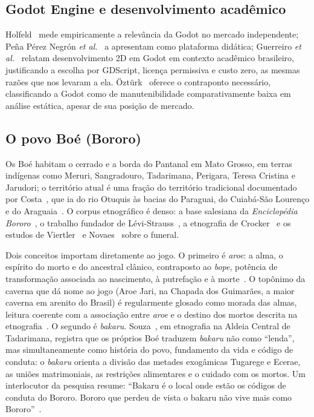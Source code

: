 \documentclass[conference]{IEEEtran}
\begin{document}
\subsection{Godot Engine e desenvolvimento acadêmico}

Holfeld~\cite{holfeld2024} mede empiricamente a relevância da Godot no mercado
independente; Peña Pérez Negrón \textit{et al.}~\cite{penaperez2023} a apresentam como
plataforma didática; Guerreiro \textit{et al.}~\cite{guerreiro2021} relatam
desenvolvimento 2D em Godot em contexto acadêmico brasileiro, justificando a escolha por
GDScript, licença permissiva e custo zero, as mesmas razões que nos levaram a ela.
Öztürk~\cite{ozturk2025} oferece o contraponto necessário, classificando a Godot como de
manutenibilidade comparativamente baixa em análise estática, apesar de sua posição de
mercado.

\subsection{O povo Boé (Bororo)}

Os Boé habitam o cerrado e a borda do Pantanal em Mato Grosso, em terras indígenas como
Meruri, Sangradouro, Tadarimana, Perigara, Teresa Cristina e Jarudori; o território
atual é uma fração do território tradicional documentado por
Costa~\cite{costaikuiapa2019}, que ia do rio Otuquis às bacias do Paraguai, do
Cuiabá-São Lourenço e do Araguaia~\cite{serpa2025}. O corpus etnográfico é denso: a base
salesiana da
\textit{Enciclopédia Bororo}~\cite{albisetti1962,albisetti1969}, o trabalho fundador de
Lévi-Strauss~\cite{levistrauss1936}, a etnografia de Crocker~\cite{crocker1985} e os
estudos de Viertler~\cite{viertler1991} e Novaes~\cite{novaes2006} sobre o funeral.

Dois conceitos importam diretamente ao jogo. O primeiro é \textit{aroe}: a alma, o
espírito do morto e do ancestral clânico, contraposto ao \textit{bope}, potência de
transformação associada ao nascimento, à putrefação e à morte~\cite{serpa2025}. O
topônimo da caverna que dá nome ao jogo (Aroe Jari, na Chapada dos Guimarães, a maior
caverna em arenito do Brasil) é regularmente glosado como morada das almas, leitura
coerente com a associação entre \textit{aroe} e o destino dos mortos descrita na
etnografia~\cite{crocker1985,viertler1991}. O segundo é \textit{bakaru}.
Souza~\cite{souzabakaru,souza2014}, em etnografia na Aldeia Central de Tadarimana,
registra que os próprios Boé traduzem \textit{bakaru} não como ``lenda'', mas
simultaneamente como história do povo, fundamento da vida e código de conduta: o
\textit{bakaru} orienta a divisão das metades exogâmicas Tugarege e Ecerae, as uniões
matrimoniais, as restrições alimentares e o cuidado com os mortos. Um interlocutor da
pesquisa resume: ``Bakaru é o local onde estão os códigos de conduta do Bororo. Bororo
que perdeu de vista o bakaru não vive mais como Bororo''~\cite{souzabakaru}.
\end{document}
